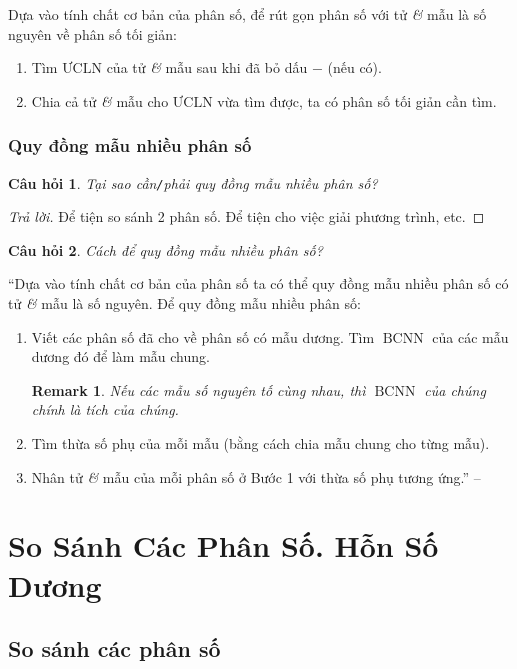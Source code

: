 \documentclass[oneside]{book}
\numberwithin{equation}{section}
\newtheorem{cauhoi}{Câu hỏi}[section]
\newtheorem{remark}{Remark}[section]
\begin{document}
Dựa vào tính chất cơ bản của phân số, để rút gọn phân số với tử \textit{\&} mẫu là số nguyên về phân số tối giản:
\begin{enumerate}
	\item Tìm $\mbox{ƯCLN}$ của tử \textit{\&} mẫu sau khi đã bỏ dấu $-$ (nếu có).
	\item Chia cả tử \textit{\&} mẫu cho $\mbox{ƯCLN}$ vừa tìm được, ta có phân số  tối giản cần tìm.
\end{enumerate}

\subsubsection{Quy đồng mẫu nhiều phân số}
\begin{cauhoi}
	Tại sao cần\emph{\texttt{/}}phải quy đồng mẫu nhiều phân số?
\end{cauhoi}

\begin{proof}[Trả lời]
	Để tiện so sánh 2 phân số. Để tiện cho việc giải phương trình, etc.
\end{proof}

\begin{cauhoi}
	Cách để quy đồng mẫu nhiều phân số?
\end{cauhoi}
``Dựa vào tính chất cơ bản của phân số ta có thể quy đồng mẫu nhiều phân số có tử \textit{\&} mẫu là số nguyên. Để quy đồng mẫu nhiều phân số:
\begin{enumerate}
	\item Viết các phân số đã cho về phân số có mẫu dương. Tìm $\operatorname{BCNN}$ của các mẫu dương đó để làm mẫu chung.
	\begin{remark}
		Nếu các mẫu số nguyên tố cùng nhau, thì $\operatorname{BCNN}$ của chúng chính là tích của chúng.
	\end{remark}
	\item Tìm thừa số phụ của mỗi mẫu (bằng cách chia mẫu chung cho từng mẫu).
	\item Nhân tử \textit{\&} mẫu của mỗi phân số ở Bước 1 với thừa số phụ tương ứng.'' -- \cite[p. 29]{Thai_Anh_Dat_Ha_Loan_Nam_Quang_Toan_6_tap_2}
\end{enumerate}

\section{So Sánh Các Phân Số. Hỗn Số Dương}

\subsection{So sánh các phân số}
\end{document}

